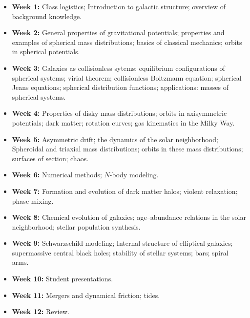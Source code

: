 \documentclass{article}
\begin{document}
\begin{itemize}

  \item {\bf Week 1:} Class logistics; Introduction to galactic
 structure; overview of background knowledge.

  \item {\bf Week 2:} General properties of gravitational potentials;
    properties and examples of spherical mass distributions; basics of
    classical mechanics; orbits in spherical potentials.

  \item {\bf Week 3:} Galaxies as collisionless sytems; equilibrium
    configurations of spherical systems; virial theorem; collisionless
    Boltzmann equation; spherical Jeans equations; spherical
    distribution functions; applications: masses of spherical systems.

  \item {\bf Week 4:} Properties of disky mass distributions; orbits
    in axisymmetric potentials; dark matter; rotation curves; gas
    kinematics in the Milky Way.

  \item {\bf Week 5:} Asymmetric drift; the dynamics of the solar
    neighborhood; Spheroidal and triaxial mass distributions; orbits
    in these mass distributions; surfaces of section; chaos.

  \item {\bf Week 6:} Numerical methods; $N$-body modeling.

  \item {\bf Week 7:} Formation and evolution of dark matter halos;
    violent relaxation; phase-mixing.

  \item {\bf Week 8:} Chemical evolution of galaxies; age--abundance
    relations in the solar neighborhood; stellar population synthesis.

  \item {\bf Week 9:} Schwarzschild modeling; Internal structure of
    elliptical galaxies; supermassive central black holes; stability
    of stellar systems; bars; spiral arms.

  \item {\bf Week 10:} Student presentations.

  \item {\bf Week 11:} Mergers and dynamical friction; tides.

  \item {\bf Week 12:} Review.

\end{itemize}
\end{document}
